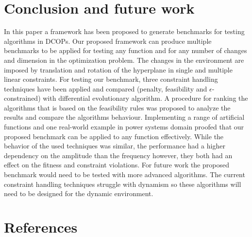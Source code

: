 \documentclass[review]{elsarticle}
\begin{document}
\section{Conclusion and future work} \label{sec:conclusion}
In this paper a framework has been proposed to generate benchmarks for testing algorithms in DCOPs. Our proposed framework can produce multiple benchmarks to be applied for testing any function and for any number of changes and dimension in the optimization problem. The changes in the environment are imposed by translation and rotation of the hyperplane in single and multiple linear constraints.
For testing our benchmark, three constraint handling techniques have been applied and compared (penalty, feasibility and $\epsilon$-constrained) with differential evolutionary algorithm. A procedure for ranking the algorithms that is based on the feasibility rules was proposed to analyze the results and compare the algorithms behaviour.
Implementing a range of artificial functions and one real-world example in power systems domain proofed that our proposed benchmark can be applied to any function effectively.
While the behavior of the used techniques was similar, the performance had a higher dependency on the amplitude than the frequency however, they both had an effect on the fitness and constraint violations. 
For future work the proposed benchmark would need to be tested with more advanced algorithms. The current constraint handling techniques struggle with dynamism so these algorithms will need to be designed for the dynamic environment. 

\section*{References}


\end{document}
